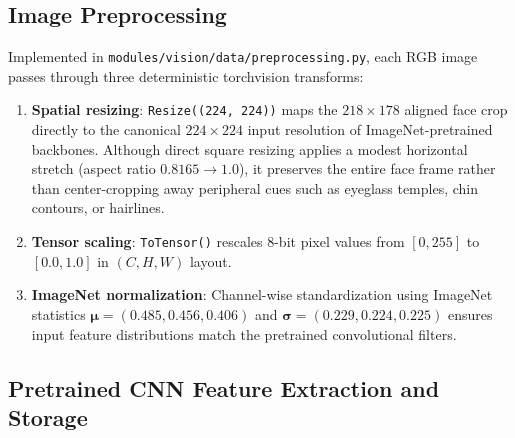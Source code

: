 \documentclass[12pt,a4paper]{article}
\newcommand{\code}[1]{\texttt{#1}}
\begin{document}
\subsection{Image Preprocessing}
\label{subsec:preprocessing}

Implemented in \code{modules/\allowbreak{}vision/\allowbreak{}data/\allowbreak{}preprocessing.py}, each RGB image passes through three deterministic torchvision transforms:
\begin{enumerate}[leftmargin=20pt, itemsep=2pt]
  \item \textbf{Spatial resizing}: \code{Resize((224, 224))} maps the $218 \times 178$ aligned face crop directly to the canonical $224 \times 224$ input resolution of ImageNet-pretrained backbones. Although direct square resizing applies a modest horizontal stretch (aspect ratio $0.8165 \to 1.0$), it preserves the entire face frame rather than center-cropping away peripheral cues such as eyeglass temples, chin contours, or hairlines.
  \item \textbf{Tensor scaling}: \code{ToTensor()} rescales 8-bit pixel values from $[0, 255]$ to $[0.0, 1.0]$ in $(C, H, W)$ layout.
  \item \textbf{ImageNet normalization}: Channel-wise standardization using ImageNet statistics $\boldsymbol{\mu} = (0.485, 0.456, 0.406)$ and $\boldsymbol{\sigma} = (0.229, 0.224, 0.225)$ ensures input feature distributions match the pretrained convolutional filters.
\end{enumerate}

\subsection{Pretrained CNN Feature Extraction and Storage}
\label{subsec:feature_extraction}
\end{document}
